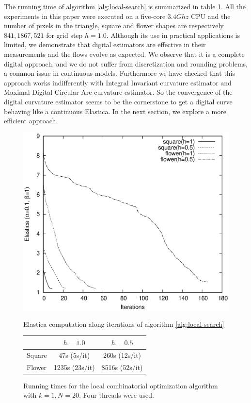 \documentclass[smallextended]{svjour3}       %
\begin{document}
The running time of algorithm \ref{alg:local-search} is summarized in table \ref{tab:summary-local-comb-rtime}. All the
experiments in this paper were executed on a five-core $3.4Ghz$ CPU and the number of pixels in the triangle, square and
flower shapes are respectively $841,1867,521$ for grid step $h=1.0$. Although its use in practical applications is
limited, we demonstrate that digital estimators are effective in their measurements and the flows evolve as expected. We
observe that it is a complete digital approach, and we do not suffer from discretization and rounding problems, a common
issue in continuous models.  Furthermore we have checked that this approach works indifferently with Integral Invariant
curvature estimator and Maximal Digital Circular Arc curvature estimator. So the convergence of the digital curvature
estimator seems to be the cornerstone to get a digital curve behaving like a continuous Elastica.  In the next section,
we explore a more efficient approach.



\begin{figure}[!h]
\begin{minipage}[b]{0.5\textwidth}
\center
\includegraphics[scale=0.35]{images/local_search/square-flower.eps}
\caption{Elastica computation along iterations of algorithm \ref{alg:local-search}}
\label{fig:plot-elastica-local-search}
\end{minipage}\hspace{40pt}%
\begin{minipage}[b]{0.45\textwidth}
\center
\captionsetup{type=table}
\begin{tabular}{|l|c|c|}
\hline
& $h=1.0$ & $h=0.5$\\
\hline
Square & 47s (5s/it) & 260s (12s/it)\\
\hline
Flower & 1235s (23s/it)  & 8516s (52s/it)\\
\hline
\end{tabular}
\caption{Running times for the local combinatorial optimization algorithm with $k=1,N=20$. Four threads were used.}
\label{tab:summary-local-comb-rtime}
\end{minipage}
\end{figure}
\end{document}
